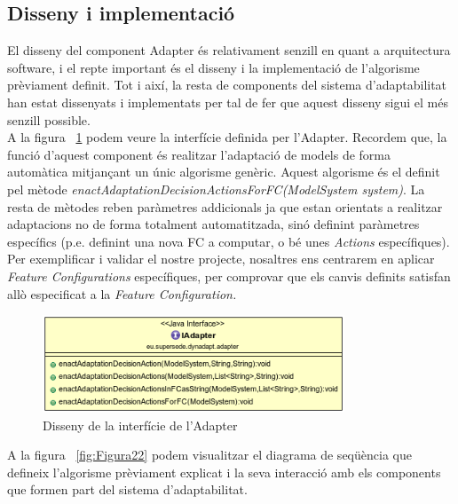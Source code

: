 \subsection{Disseny i implementació}

El disseny del component Adapter és relativament senzill en quant a arquitectura software, i el repte important és el disseny i la implementació de l'algorisme prèviament definit. Tot i així, la resta de components del sistema d'adaptabilitat han estat dissenyats i implementats per tal de fer que aquest disseny sigui el més senzill possible.\\

A la figura ~\ref{fig:Figura26} podem veure la interfície definida per l'Adapter. Recordem que, la funció d'aquest component és realitzar l'adaptació de models de forma automàtica mitjançant un únic algorisme genèric. Aquest algorisme és el definit pel mètode \textit{enactAdaptationDecisionActionsForFC(ModelSystem system)}. La resta de mètodes reben paràmetres addicionals ja que estan orientats a realitzar adaptacions no de forma totalment automatitzada, sinó definint paràmetres específics (p.e. definint una nova FC a computar, o bé unes \textit{Actions} específiques). Per exemplificar i validar el nostre projecte, nosaltres ens centrarem en aplicar \textit{Feature Configurations} específiques, per comprovar que els canvis definits satisfan allò especificat a la \textit{Feature Configuration.}\\

\begin{figure}
\centering
\includegraphics[width=9cm]{Figures/Figure26}
\decoRule
\caption{Disseny de la interfície de l'Adapter}
\label{fig:Figura26}
\end{figure}

A la figura ~\ref{fig:Figura22} podem visualitzar el diagrama de seqüència que defineix l'algorisme prèviament explicat i la seva interacció amb els components que formen part del sistema d'adaptabilitat. 

